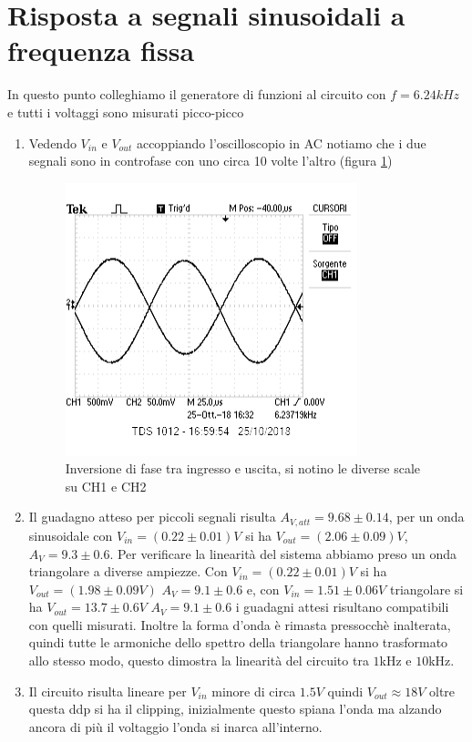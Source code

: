 \documentclass[10pt,a4paper]{article}
\begin{document}
\section{Risposta a segnali sinusoidali a frequenza fissa}
In questo punto colleghiamo il generatore di funzioni al circuito con $f=6.24kHz$ e tutti i voltaggi sono misurati picco-picco
\begin{enumerate}
\item Vedendo $V_{in}$ e $V_{out}$ accoppiando l'oscilloscopio in AC notiamo che i due segnali sono in controfase con uno circa 10 volte l'altro (figura \ref{screen})
\begin{figure}
\centering
\includegraphics[scale=1]{3_1.png}
\caption{Inversione di fase tra ingresso e uscita, si notino le diverse scale su CH1 e CH2}
\label{screen} 
\end{figure}

\item Il guadagno atteso per piccoli segnali risulta $A_{V,att}=9.68\pm0.14$, per un onda sinusoidale con $V_{in} = (0.22\pm0.01)V$ si ha $V_{out} = (2.06\pm0.09)V$, $A_V=9.3\pm0.6$. Per verificare la linearità del sistema abbiamo preso un onda triangolare a diverse ampiezze. Con $V_{in} = (0.22\pm0.01)V$ si ha $V_{out} = (1.98\pm0.09V)$ $A_V=9.1\pm0.6$ e, con $V_{in} = 1.51\pm0.06V$  triangolare si ha $V_{out} = 13.7\pm0.6V$ $A_V=9.1\pm0.6$ i guadagni attesi risultano compatibili con quelli misurati.\newline
Inoltre la forma d'onda è rimasta pressocchè inalterata, quindi tutte le armoniche dello spettro della triangolare hanno trasformato allo stesso modo, questo dimostra la linearità del circuito tra $1$kHz e $10$kHz.\newline
\item Il circuito risulta lineare per $V_{in}$ minore di circa $1.5 V$ quindi $V_{out} \approx 18 V$ oltre questa ddp si ha il clipping, inizialmente questo spiana l'onda ma alzando ancora di più il voltaggio l'onda si inarca all'interno. 
\end{enumerate}		
\end{document}
